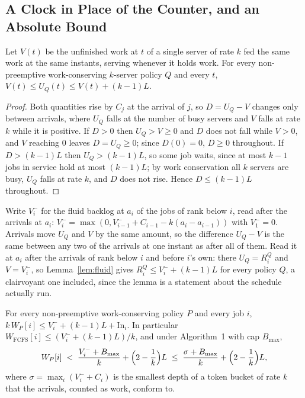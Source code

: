 
\subsection{A Clock in Place of the Counter, and an Absolute Bound}
\label{sec:supp_clock}

\begin{lemma}
\label{lem:fluid}
Let $V(t)$ be the unfinished work at $t$ of a single server of rate $k$ fed the same
work at the same instants, serving whenever it holds work. For every
non-preemptive work-conserving $k$-server policy $Q$ and every $t$,
$V(t) \le U_Q(t) \le V(t) + (k-1)L$.
\end{lemma}

\begin{proof}
Both quantities rise by $C_j$ at the arrival of $j$, so $D = U_Q - V$ changes only
between arrivals, where $U_Q$ falls at the number of busy servers and $V$ falls at
rate $k$ while it is positive. If $D > 0$ then $U_Q > V \ge 0$ and $D$ does not
fall while $V > 0$, and $V$ reaching $0$ leaves $D = U_Q \ge 0$; since $D(0) = 0$,
$D \ge 0$ throughout. If $D > (k-1)L$ then $U_Q > (k-1)L$, so some job waits, since
at most $k-1$ jobs in service hold at most $(k-1)L$; by work conservation all $k$
servers are busy, $U_Q$ falls at rate $k$, and $D$ does not rise. Hence
$D \le (k-1)L$ throughout.
\end{proof}

Write $V_i^-$ for the fluid backlog at $a_i$ of the jobs of rank below $i$, read after
the arrivals at $a_i$: $V_i^- = \max(0, V_{i-1}^- + C_{i-1} - k(a_i - a_{i-1}))$ with
$V_1^- = 0$. Arrivals move $U_Q$ and $V$ by the same amount, so the difference
$U_Q - V$ is the same between any two of the arrivals at one instant as after all of
them. Read it at $a_i$ after the arrivals of rank below $i$ and before $i$'s own: there
$U_Q = R^Q_i$ and $V = V_i^-$, so Lemma~\ref{lem:fluid} gives
$R^Q_i \le V_i^- + (k-1)L$ for every policy $Q$, a clairvoyant one included, since the
lemma is a statement about the schedule actually run.

\begin{proposition}
\label{prop:absolute}
For every non-preemptive work-conserving policy $P$ and every job $i$,
$k\,W_P[i] \le V_i^- + (k-1)L + \mathrm{In}_i$. In particular
$W_{\mathrm{FCFS}}[i] \le (V_i^- + (k-1)L)/k$, and under Algorithm~1 with cap
$B_{\max}$,
\[
  W_P[i] \;<\; \frac{V_i^- + B_{\max}}{k} + \Bigl(2 - \frac{1}{k}\Bigr)L
         \;\le\; \frac{\sigma + B_{\max}}{k} + \Bigl(2 - \frac{1}{k}\Bigr)L ,
\]
where $\sigma = \max_i (V_i^- + C_i)$ is the smallest depth of a token bucket of
rate $k$ that the arrivals, counted as work, conform to.
\end{proposition}

